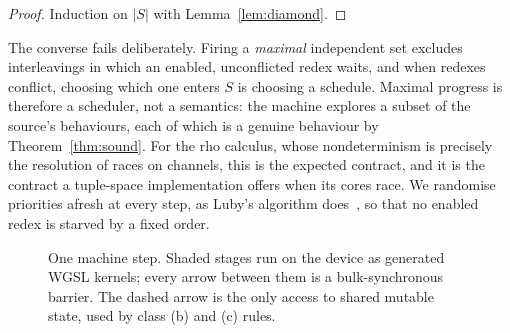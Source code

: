 \documentclass[acmsmall,screen,review,anonymous]{acmart}
\begin{document}
\begin{proof}
Induction on $|S|$ with Lemma~\ref{lem:diamond}.
\end{proof}

The converse fails deliberately. Firing a \emph{maximal} independent set
excludes interleavings in which an enabled, unconflicted redex waits, and when
redexes conflict, choosing which one enters $S$ is choosing a schedule. Maximal
progress is therefore a scheduler, not a semantics: the machine explores a
subset of the source's behaviours, each of which is a genuine behaviour by
Theorem~\ref{thm:sound}. For the rho calculus, whose nondeterminism is
precisely the resolution of races on channels, this is the expected contract,
and it is the contract a tuple-space implementation offers when its cores
race. We randomise priorities afresh at every step, as Luby's algorithm
does~\cite{Luby86}, so that no enabled redex is starved by a fixed order.

\begin{figure}[t]
\centering
{}
\caption{One machine step. Shaded stages run on the device as generated WGSL
kernels; every arrow between them is a bulk-synchronous barrier. The dashed
arrow is the only access to shared mutable state, used by class (b) and (c)
rules.}
\label{fig:step}
\end{figure}
\end{document}
